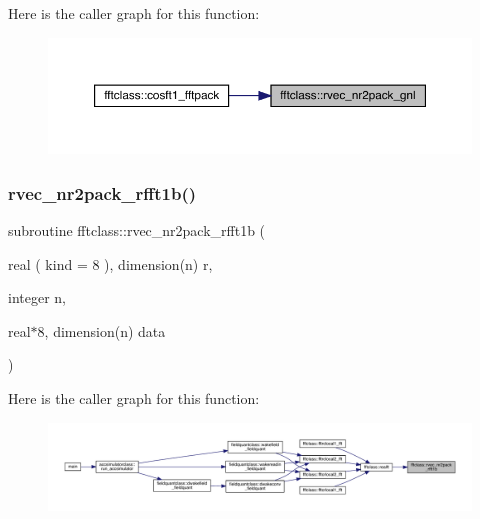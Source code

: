Here is the caller graph for this function\+:\nopagebreak
\begin{figure}[H]
\begin{center}
\leavevmode
\includegraphics[width=350pt]{namespacefftclass_a2c47e8aa546c8ea9f5f23219be52d57e_icgraph}
\end{center}
\end{figure}
\mbox{\label{namespacefftclass_a78a858cc72da790e88dc826f5bdd14b3}} 
\subsubsection{\texorpdfstring{rvec\_nr2pack\_rfft1b()}{rvec\_nr2pack\_rfft1b()}}
{\footnotesize\ttfamily subroutine fftclass\+::rvec\+\_\+nr2pack\+\_\+rfft1b (\begin{DoxyParamCaption}\item[{real ( kind = 8 ), dimension(n)}]{r,  }\item[{integer}]{n,  }\item[{real$\ast$8, dimension(n)}]{data }\end{DoxyParamCaption})}

Here is the caller graph for this function\+:\nopagebreak
\begin{figure}[H]
\begin{center}
\leavevmode
\includegraphics[width=350pt]{namespacefftclass_a78a858cc72da790e88dc826f5bdd14b3_icgraph}
\end{center}
\end{figure}
\mbox{\label{namespacefftclass_ac09ed442a8bb7846768adbe2d5c798c6}} 
